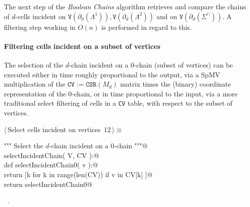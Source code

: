 \documentclass[11pt,oneside]{article}	%
\begin{document}
The next step of the \emph{Boolean Chains} algorithm retrieves and compare the chains of $d$-cells incident on $\texttt{V}(\partial_d(\Lambda^1)), \texttt{V}(\partial_d(\Lambda^2))$ and on $\texttt{V}(\partial_d(\Sigma^\cap))$. A filtering step working in $O(n)$ is performed in regard to this.

\paragraph{Filtering cells incident on a subset of vertices}

The selection of the $d$-chain incident on a $0$-chain (subset of vertices) can be executed either in time roughly proportional to the output, via a SpMV multiplication of the $\texttt{CV} := \texttt{CSR}(M_d)$ matrix times the (binary) coordinate representation of the $0$-chain, or in time proportional to the input, via a more traditional select filtering of cells in a \texttt{CV} table, with respect to the subset of vertices.


\begin{flushleft} \small \label{scrap21}
\protect{}$\langle\,$Select cells incident on vertices\nobreak\ {\footnotesize 12}$\,\rangle\equiv$
\vspace{-1ex}
\begin{list}{}{} \item
\mbox{}\verb@""" Select the $d$-chain incident on a $0$-chain """@\\
\mbox{}\verb@def selectIncidentChain( V, CV ):@\\
\mbox{}\verb@   def selectIncidentChain0( v ):@\\
\mbox{}\verb@      return [k for k in range(len(CV)) if v in CV[k] ]@\\
\mbox{}\verb@   return selectIncidentChain0@\\
\mbox{}\verb@@{\NWsep}
\end{list}
\vspace{-1ex}
\footnotesize\addtolength{\baselineskip}{-1ex}
\begin{list}{}{\setlength{\itemsep}{-\parsep}\setlength{\itemindent}{-\leftmargin}}
\item \NWtxtMacroRefIn\ .
\end{list}
\end{flushleft}
\end{document}
